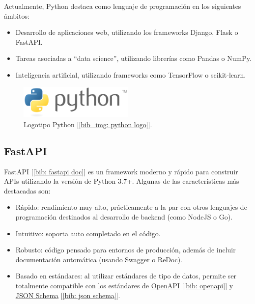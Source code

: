 \documentclass[a4paper, oneside, 12pt]{book}
\begin{document}
	\noindent Actualmente, Python destaca como lenguaje de programación en los siguientes ámbitos:
	\begin{itemize}
		\item Desarrollo de aplicaciones web, utilizando los frameworks Django, Flask o FastAPI.
		\item Tareas asociadas a ``data science'', utilizando librerías como Pandas o NumPy.
		\item Inteligencia artificial, utilizando frameworks como TensorFlow o scikit-learn.
	\end{itemize}
	
	\begin{figure}[h!]
		\begin{center}
			\includegraphics[width=0.5\textwidth]{img/python_logo.png}
			\caption{Logotipo Python [\ref{bib_img: python logo}].}
			\label{img: python logo}
		\end{center}
	\end{figure}
	
	\subsection{FastAPI}
	\label{sec: fastapi}
	
	\noindent FastAPI [\ref{bib: fastapi doc}] es un framework moderno y rápido para construir APIs utilizando la versión de Python 3.7+. Algunas de las características más destacadas son:
	
	\begin{itemize}
		\item Rápido: rendimiento muy alto, prácticamente a la par con otros lenguajes de programación destinados al desarrollo de backend (como NodeJS o Go).
		\item Intuitivo: soporta auto completado en el código.
		\item Robusto: código pensado para entornos de producción, además de incluir documentación automática (usando Swagger o ReDoc).
		\item Basado en estándares: al utilizar estándares de tipo de datos, permite ser totalmente compatible con los estándares de \href{https://github.com/OAI/OpenAPI-Specification}{OpenAPI} [\ref{bib: openapi}] y \href{https://json-schema.org/}{JSON Schema} [\ref{bib: json schema}].
	\end{itemize}
	
\end{document}
